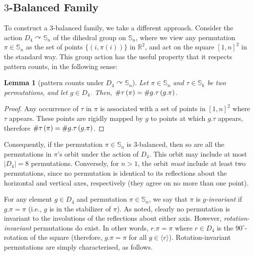 \documentclass{article}
\newtheorem{lemma}[theorem]{Lemma}
\newcommand{\threeb}{$3$-balanced\xspace}
\newcommand{\Sn}{\mathbb{S}_n}
\newcommand{\RR}{\mathbb{R}}
\newcommand{\pc}[2]{{\# \mathtt{ #1 } \left( #2 \right)}}
\theoremstyle{remark}
\def\acts{\curvearrowright}
\theoremstyle{plain}
\begin{document}
\subsection{\texorpdfstring{$3$}{3}-Balanced Family}
\label{subsect:3bal_construction}

To construct a \threeb family, we take a different approach. Consider the action $D_4 \acts \Sn$ of the dihedral group on $\Sn$, where we view
any permutation $\pi \in \Sn$ as the set of points $\{(i, \pi(i))\}$ in $\RR^2$, and act on the square $[1,n]^2$ in the standard way. This group action has the useful property that it respects pattern counts, in the following sense:

\begin{lemma}[pattern counts under $D_4 \acts \Sn$]
    \label{lemma:pc_D4}
    Let $\pi\in\Sn$ and $\tau\in\mathbb{S}_k$ be two permutations, and let $g \in D_4$. Then,  $\pc{\tau}{\pi} = \pc{\mathnormal{g.\tau}}{g.\pi}$.
\end{lemma}

\begin{proof}
    Any occurrence of $\tau$ in $\pi$ is associated with a set of points in $[1,n]^2$ where $\tau$ appears. These points are rigidly mapped by $g$ to points at which $g.\tau$ appears, therefore  $\pc{\tau}{\pi} = \pc{\mathnormal{g.\tau}}{g.\pi}$.
\end{proof}

Consequently, if the permutation $\pi \in \mathbb{S}_n$ is $3$-balanced, then so are
all the permutations in $\pi$'s orbit under the action of $D_4$. This orbit may include at most $|D_4| = 8$ permutations. Conversely, for $n > 1$, the orbit \emph{must} include at least two permutations, since no permutation is identical to its reflections about the horizontal and vertical axes, respectively (they agree on no more than one point).

For any element $g \in D_4$ and permutation $\pi \in \Sn$, we say that $\pi$ is \emph{$g$-invariant} if $g.\pi = \pi$ (i.e., $g$ is in the stabilizer of $\pi$). As noted, clearly no permutation is invariant to the involutions of the reflections about either axis. However, \emph{rotation-invariant} permutations do exist. In other words, $r.\pi = \pi$ where $r \in D_4$ is the $90^\circ$-rotation of the square (therefore, $g.\pi = \pi$ for all $g\in \langle r \rangle$). Rotation-invariant permutations are simply characterised, as follows.
\end{document}
